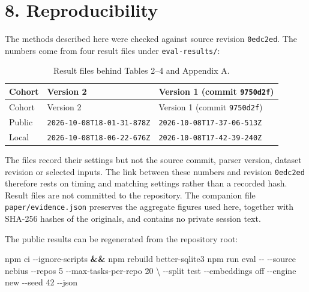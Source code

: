 \documentclass[
  american,
  11pt,
]{article}
\newenvironment{Shaded}{}{}
\newcommand{\AttributeTok}[1]{\textcolor[rgb]{0.49,0.56,0.16}{#1}}
\newcommand{\DataTypeTok}[1]{\textcolor[rgb]{0.56,0.13,0.00}{#1}}
\newcommand{\ExtensionTok}[1]{#1}
\newcommand{\KeywordTok}[1]{\textcolor[rgb]{0.00,0.44,0.13}{\textbf{#1}}}
\newcommand{\NormalTok}[1]{#1}
\begin{document}
\section{8. Reproducibility}\label{reproducibility}

The methods described here were checked against source revision \texttt{0edc2ed}. The numbers come from four
result files under \texttt{eval-results/}:

\begin{longtable}[]{@{}lll@{}}
\caption{Result files behind Tables 2--4 and Appendix A.}\tabularnewline
\toprule\noalign{}
Cohort & Version 2 & Version 1 (commit \texttt{9750d2f}) \\
\midrule\noalign{}
\endfirsthead
\toprule\noalign{}
Cohort & Version 2 & Version 1 (commit \texttt{9750d2f}) \\
\midrule\noalign{}
\endhead
\bottomrule\noalign{}
\endlastfoot
Public & \texttt{2026-10-08T18-01-31-878Z} & \texttt{2026-10-08T17-37-06-513Z} \\
Local & \texttt{2026-10-08T18-06-22-676Z} & \texttt{2026-10-08T17-42-39-240Z} \\
\end{longtable}

The files record their settings but not the source commit, parser version, dataset revision or selected
inputs. The link between these numbers and revision \texttt{0edc2ed} therefore rests on timing and matching
settings rather than a recorded hash. Result files are not committed to the repository. The companion file
\texttt{paper/evidence.json} preserves the aggregate figures used here, together with SHA-256 hashes of the
originals, and contains no private session text.

The public results can be regenerated from the repository root:

\begin{Shaded}
\begin{Highlighting}[]
\ExtensionTok{npm}\NormalTok{ ci }\AttributeTok{{-}{-}ignore{-}scripts} \KeywordTok{\&\&} \ExtensionTok{npm}\NormalTok{ rebuild better{-}sqlite3}
\ExtensionTok{npm}\NormalTok{ run eval }\AttributeTok{{-}{-}} \AttributeTok{{-}{-}source}\NormalTok{ nebius }\AttributeTok{{-}{-}repos}\NormalTok{ 5 }\AttributeTok{{-}{-}max{-}tasks{-}per{-}repo}\NormalTok{ 20 }\DataTypeTok{\textbackslash{}}
  \AttributeTok{{-}{-}split}\NormalTok{ test }\AttributeTok{{-}{-}embeddings}\NormalTok{ off }\AttributeTok{{-}{-}engine}\NormalTok{ new }\AttributeTok{{-}{-}seed}\NormalTok{ 42 }\AttributeTok{{-}{-}json}
\end{Highlighting}
\end{Shaded}
\end{document}
